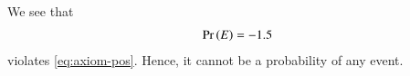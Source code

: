 We see that 
\begin{align}
\Pr\left(E\right) = -1.5 
\end{align}
violates
	\eqref{eq:axiom-pos}.
	Hence, 
it cannot be a probability of any event.

